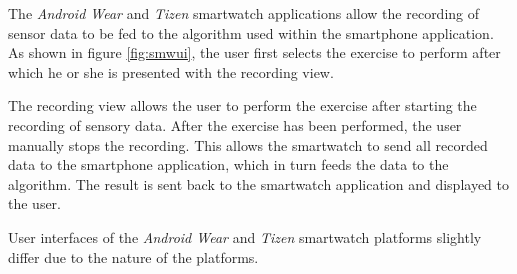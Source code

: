 The \textit{Android Wear} and \textit{Tizen} smartwatch applications allow the recording of sensor data to be fed to the algorithm used within the smartphone application. As shown in figure \ref{fig:smwui}, the user first selects the exercise to perform after which he or she is presented with the recording view.

The recording view allows the user to perform the exercise after starting the recording of sensory data. After the exercise has been performed, the user manually stops the recording. This allows the smartwatch to send all recorded data to the smartphone application, which in turn feeds the data to the algorithm. The result is sent back to the smartwatch application and displayed to the user.

User interfaces of the \textit{Android Wear} and \textit{Tizen} smartwatch platforms slightly differ due to the nature of the platforms.